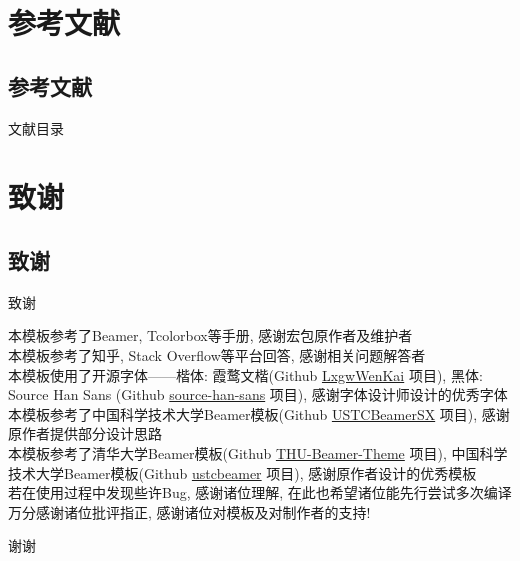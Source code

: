 \documentclass[hyperref, UTF8, CJK, aspectratio=169]{beamer}
\begin{document}
\section{参考文献}
\subsection{参考文献}
\begin{frame}[allowframebreaks]{文献目录}
	\nocite{*}
	\printbibliography[heading=none]
\end{frame}

\section{致谢}
\subsection{致谢}
\begin{frame}{致谢}
	\begin{center}
		本模板参考了Beamer, Tcolorbox等手册, 感谢宏包原作者及维护者\\[1ex]
		本模板参考了知乎, Stack Overflow等平台回答, 感谢相关问题解答者\\[1ex]
		本模板使用了开源字体——楷体: 霞鹜文楷(Github \href{https://github.com/lxgw/LxgwWenKai/}{\color{scublue}LxgwWenKai} 项目), 黑体: Source Han Sans (Github \href{https://github.com/adobe-fonts/source-han-sans/}{\color{scublue}source-han-sans} 项目), 感谢字体设计师设计的优秀字体\\[1ex]
		本模板参考了中国科学技术大学Beamer模板(Github \href{https://github.com/ysx2000/USTCBeamerSX/}{\color{scublue}USTCBeamerSX} 项目), 感谢原作者提供部分设计思路\\[1ex]
		本模板参考了清华大学Beamer模板(Github \href{https://github.com/tuna/THU-Beamer-Theme/}{\color{scublue}THU-Beamer-Theme} 项目), 中国科学技术大学Beamer模板(Github \href{https://github.com/ustctug/ustcbeamer/}{\color{scublue}ustcbeamer} 项目), 感谢原作者设计的优秀模板\\[1ex]
		
		若在使用过程中发现些许Bug, 感谢诸位理解, 在此也希望诸位能先行尝试多次编译\\[1ex]
		万分感谢诸位批评指正, 感谢诸位对模板及对制作者的支持!
	\end{center}
\end{frame}

\begin{frame}{}
	\centering
	\Huge 谢谢
\end{frame}
\end{document}
